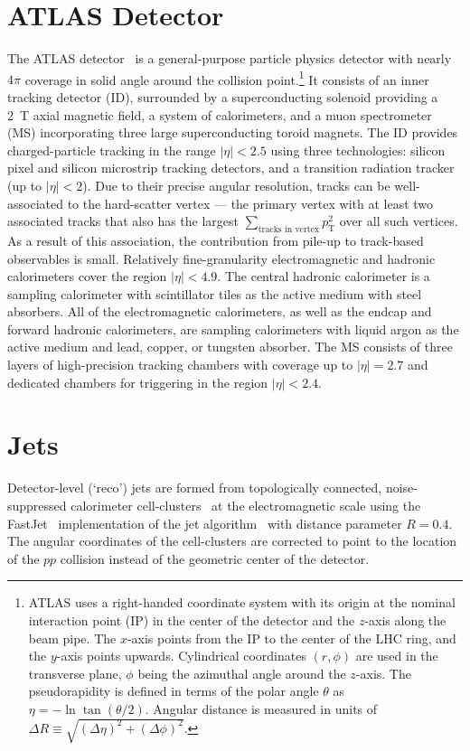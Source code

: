 \newcommand{\AtlasCoordFootnote}{
ATLAS uses a right-handed coordinate system with its origin at the nominal interaction point (IP)
in the center of the detector and the $z$-axis along the beam pipe.
The $x$-axis points from the IP to the center of the LHC ring,
and the $y$-axis points upwards.
Cylindrical coordinates $(r,\phi)$ are used in the transverse plane, 
$\phi$ being the azimuthal angle around the $z$-axis.
The pseudorapidity is defined in terms of the polar angle $\theta$ as $\eta = -\ln \tan(\theta/2)$.
Angular distance is measured in units of $\Delta R \equiv \sqrt{(\Delta\eta)^{2} + (\Delta\phi)^{2}}$.}


\section{ATLAS Detector}
\label{sec:ATLAS:ATLAS}
The ATLAS detector~\cite{PERF-2007-01} is a general-purpose particle physics detector 
%
with nearly $4\pi$ coverage in solid angle around the collision point.\footnote{\AtlasCoordFootnote}
%
It consists of an inner tracking detector (ID),  surrounded by a superconducting solenoid providing a \SI{2}{\tesla} axial magnetic field, a system of calorimeters, and a muon spectrometer (MS) incorporating three large superconducting toroid magnets.  
The ID provides charged-particle tracking in the range $|\eta| < 2.5$ using three technologies: silicon pixel and silicon microstrip tracking detectors, and a transition radiation tracker (up to $|\eta| < 2$).  Due to their precise angular resolution, tracks can be well-associated to the hard-scatter vertex — the primary vertex with at least two associated tracks that also has the largest $\sum_\text{tracks in vertex} p_\text{T}^2$ over all such vertices.  As a result of this association, the contribution from pile-up to track-based observables is small.  
%
%
Relatively fine-granularity electromagnetic and hadronic calorimeters cover the region $|\eta| < 4.9$. 
The central hadronic calorimeter is a sampling calorimeter with scintillator tiles as the active medium with steel absorbers. All of the electromagnetic calorimeters, as well as the endcap and forward hadronic calorimeters, are sampling calorimeters with liquid argon as the active medium and lead, copper, or tungsten absorber.
%
%
The MS consists of three layers of high-precision tracking chambers with coverage up to $|\eta|=2.7$ and dedicated chambers for triggering in the region $|\eta|<2.4$. 


\section{Jets}
\label{sec:ATLAS:jets}
Detector-level (`reco') jets are formed from topologically connected, noise-suppressed calorimeter cell-clusters~\cite{Aad:2016upy} at the electromagnetic scale using the FastJet~\cite{Cacciari:2011ma} implementation of the \antikt jet algorithm~\cite{Cacciari:2008gp} with distance parameter $R = 0.4$.   The angular coordinates of the cell-clusters are corrected to point to the location of the $pp$ collision instead of the geometric center of the detector.  

